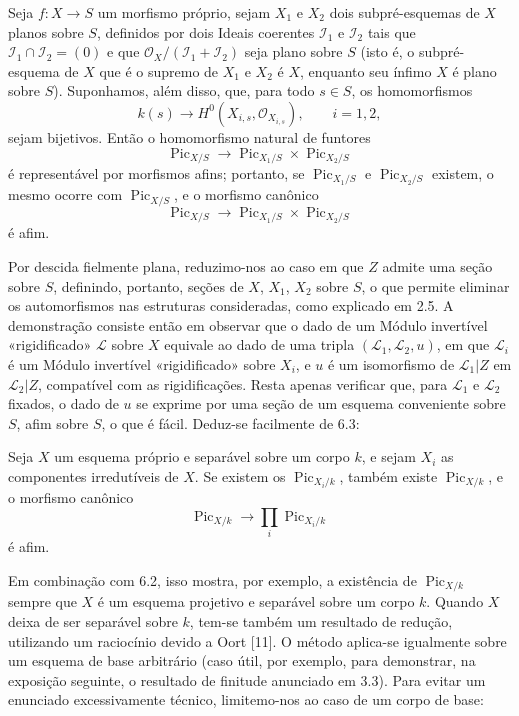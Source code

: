  Seja $f:X\longrightarrow S$ um morfismo próprio, sejam
$X_1$ e $X_2$ dois subpré-esquemas de $X$ planos sobre $S$, definidos por dois
Ideais coerentes $\mathcal I_1$ e $\mathcal I_2$ tais que
$\mathcal I_1\cap\mathcal I_2=(0)$ e que
$\mathcal O_X/(\mathcal I_1+\mathcal I_2)$ seja plano sobre $S$ (isto é, o
subpré-esquema de $X$ que é o supremo de $X_1$ e $X_2$ é $X$, enquanto seu ínfimo $X$
é plano sobre $S$).
 Suponhamos, além disso, que, para todo $s\in S$, os
homomorfismos
\[
k(s)\longrightarrow H^0(X_{i,s},\mathcal O_{X_{i,s}}),\qquad i=1,2,
\]
sejam bijetivos. Então o homomorfismo natural de funtores
\[
\operatorname{Pic}_{X/S}\longrightarrow
\operatorname{Pic}_{X_1/S}\times\operatorname{Pic}_{X_2/S}
\]
é representável por morfismos afins; portanto, se
$\operatorname{Pic}_{X_1/S}$ e $\operatorname{Pic}_{X_2/S}$ existem, o mesmo
ocorre com $\operatorname{Pic}_{X/S}$, e o morfismo canônico
\[
\operatorname{Pic}_{X/S}\longrightarrow
\operatorname{Pic}_{X_1/S}\times\operatorname{Pic}_{X_2/S}
\]
é afim.

Por descida fielmente plana, reduzimo-nos ao caso em que $Z$ admite uma seção
sobre $S$, definindo, portanto, seções de $X$, $X_1$, $X_2$ sobre $S$, o que
permite eliminar os automorfismos nas estruturas consideradas, como explicado
em 2.5. A demonstração consiste então em observar que o dado de um Módulo
invertível
«rigidificado» $\mathcal L$ sobre $X$ equivale ao dado de uma tripla
$(\mathcal L_1,\mathcal L_2,u)$, em que $\mathcal L_i$ é um Módulo invertível
«rigidificado» sobre $X_i$, e $u$ é um isomorfismo de
$\mathcal L_1|Z$ em $\mathcal L_2|Z$, compatível com as rigidificações.
Resta apenas verificar que, para $\mathcal L_1$ e $\mathcal L_2$ fixados, o
dado de $u$ se exprime por uma seção de um esquema conveniente sobre $S$, afim
sobre $S$, o que é fácil. Deduz-se facilmente de 6.3:

 Seja $X$ um esquema próprio e separável sobre um corpo
$k$, e sejam $X_i$ as componentes irredutíveis de $X$. Se existem os
$\operatorname{Pic}_{X_i/k}$, também existe $\operatorname{Pic}_{X/k}$, e o
morfismo canônico
\[
\operatorname{Pic}_{X/k}\longrightarrow\prod_i\operatorname{Pic}_{X_i/k}
\]
é afim.

Em combinação com 6.2, isso mostra, por exemplo, a existência de
$\operatorname{Pic}_{X/k}$ sempre que $X$ é um esquema projetivo e separável
sobre um corpo $k$. Quando $X$ deixa de ser separável sobre $k$, tem-se também
um resultado de redução, utilizando um raciocínio devido a Oort [11]. O método
aplica-se igualmente sobre um esquema de base arbitrário (caso útil, por
exemplo, para demonstrar, na exposição seguinte, o resultado de finitude
anunciado em 3.3). Para evitar um enunciado excessivamente técnico,
limitemo-nos ao caso de um corpo de base:

